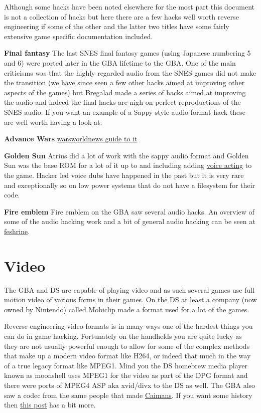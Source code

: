 \documentclass[
]{book}
\begin{document}
Although some hacks have been noted elsewhere for the most part this document is not a collection of hacks but here there are a few hacks well worth reverse engineering if some of the other and the latter two titles have some fairly extensive game specific documentation included.

\textbf{Final fantasy} The last SNES final fantasy games (using Japanese numbering 5 and 6) were ported later in the GBA lifetime to the GBA. One of the main criticisms was that the highly regarded audio from the SNES games did not make the transition (we have since seen a few other hacks aimed at improving other aspects of the games) but Bregalad made a series of hacks aimed at improving the audio and indeed the final hacks are nigh on perfect reproductions of the SNES audio. If you want an example of a Sappy style audio format hack these are well worth having a look at.

\textbf{Advance Wars} \href{http://forums.warsworldnews.com/viewtopic.php?t=2002}{warsworldnews guide to it}

\textbf{Golden Sun} Atrius did a lot of work with the sappy audio format and Golden Sun was the base ROM for a lot of it up to and including adding \href{http://forum.goldensunhacking.net/index.php?action=downloads;sa=view;down=4}{voice acting} to the game. Hacker led voice dubs have happened in the past but it is very rare and exceptionally so on low power systems that do not have a filesystem for their code.

\textbf{Fire emblem} Fire emblem on the GBA saw several audio hacks. An overview of some of the audio hacking work and a bit of general audio hacking can be seen at \href{http://www.feshrine.net/ultimatetutorial/}{feshrine}.

\hypertarget{video}{%
\section{Video}\label{video}}

The GBA and DS are capable of playing video and as such several games use full motion video of various forms in their games. On the DS at least a company (now owned by Nintendo) called Mobiclip made a format used for a lot of the games.

Reverse engineering video formats is in many ways one of the hardest things you can do in game hacking. Fortunately on the handhelds you are quite lucky as they are not usually powerful enough to allow for some of the complex methods that make up a modern video format like H264, or indeed that much in the way of a true legacy format like MPEG1. Mind you the DS homebrew media player known as moonshell uses MPEG1 for the video as part of the DPG format and there were ports of MPEG4 ASP aka xvid/divx to the DS as well. The GBA also saw a codec from the same people that made \href{http://www.ds-video.com/index.htm}{Caimans}. If you want some history then \href{http://gbatemp.net/threads/video-codec-for-gba.354591/\#post-5038482}{this post} has a bit more.
\end{document}
